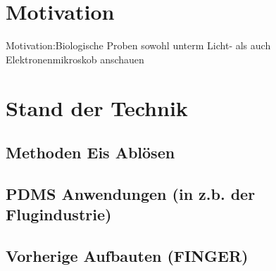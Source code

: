 \section{Motivation}
Motivation:Biologische Proben sowohl unterm Licht- als auch Elektronenmikroskob anschauen

\section{Stand der Technik}

\subsection{Methoden Eis Ablösen}

\subsection{PDMS Anwendungen (in z.b. der Flugindustrie)}

\subsection{Vorherige Aufbauten (FINGER)}

